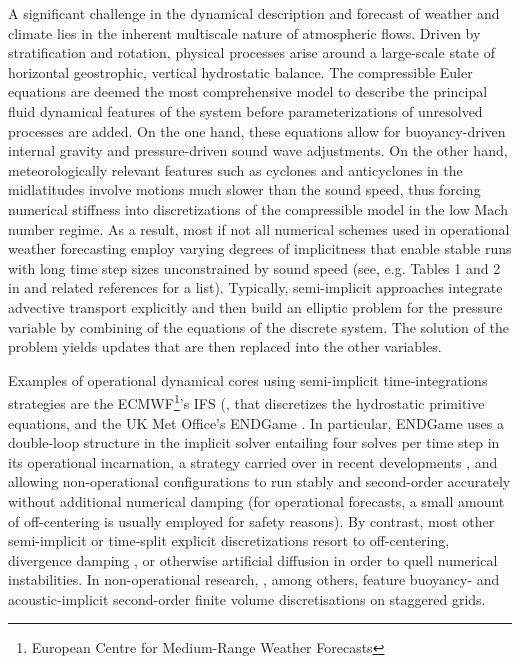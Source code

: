 \documentclass{ametsoc}
\theoremstyle{definition}
\begin{document}
A significant challenge in the dynamical description and forecast of weather and climate lies in the inherent multiscale nature of atmospheric flows. Driven by stratification and rotation, physical processes arise around a large-scale state of horizontal geostrophic, vertical hydrostatic balance. The compressible Euler equations are deemed the most comprehensive model to describe the principal fluid dynamical features of the system before parameterizations of unresolved processes are added. On the one hand, these equations allow for buoyancy-driven internal gravity and pressure-driven sound wave adjustments.  On the other hand, meteorologically relevant features such as cyclones and anticyclones in the midlatitudes involve motions much slower than the sound speed, thus forcing numerical stiffness into discretizations of the compressible model in the low Mach number regime. As a result, most if not all numerical schemes used in operational weather forecasting employ varying degrees of implicitness that enable stable runs with long time step sizes unconstrained by sound speed (see, e.g. Tables 1 and 2 in \cite{MarrasEtAl2016} and related references for a list). Typically, semi-implicit approaches integrate advective transport explicitly and then build an elliptic problem for the pressure variable by combining of the equations of the discrete system. The solution of the problem yields updates that are then replaced into the other variables. 

Examples of operational dynamical cores using semi-implicit time-integrations strategies are the ECMWF\footnote{European Centre for Medium-Range Weather Forecasts}'s IFS (\cite{Hortal2002}, that discretizes the hydrostatic primitive equations, and the UK Met Office's ENDGame \citep{WoodEtAl2013, BenacchioWood2016}. In particular, ENDGame  uses a double-loop structure in the implicit solver entailing four solves per time step in its operational incarnation, a strategy carried over in recent developments \citep{MelvinEtAl2018}, and allowing non-operational configurations to run stably and second-order accurately without additional numerical damping (for operational forecasts, a small amount of off-centering is usually employed for safety reasons). By contrast, most other semi-implicit or time-split explicit discretizations resort to off-centering, divergence damping \citep{BryanFritsch2002}, or otherwise artificial diffusion in order to quell numerical instabilities. In non-operational research, \cite{DumbserEtAl2018}, among others, feature buoyancy- and acoustic-implicit second-order finite volume discretisations on staggered grids.
\end{document}

